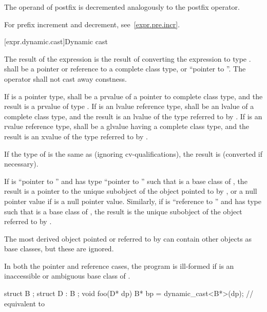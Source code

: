 \pnum
{}%
%
%
%
The operand of postfix \tcode{--} is decremented analogously to the
postfix \tcode{++} operator.
\begin{note}
For prefix increment and decrement, see~\ref{expr.pre.incr}.
\end{note}

[expr.dynamic.cast]{Dynamic cast}

\pnum
{}%
%
The result of the expression  is the result of
converting the expression  to type .
%
 shall be a pointer or reference to a complete class type, or
``pointer to \cv{} ''. The  operator shall not cast
away constness.

\pnum
If  is a pointer type,  shall be a prvalue of a
pointer to complete class type, and the result is a prvalue of type
. If  is an lvalue reference type,  shall be
an lvalue of a complete class type, and the result is an lvalue of the
type referred to by . If  is an rvalue reference type,
 shall be a glvalue having a complete class type, and the
result is an xvalue of the type referred to by .

\pnum
If the type of  is the same as  (ignoring cv-qualifications),
the result is
 (converted if necessary).

\pnum
If  is ``pointer to  '' and  has
type ``pointer to  '' such that  is a base
class of , the result is a pointer to the unique 
subobject of the  object pointed to by , or
a null pointer value if  is a null pointer value.
Similarly, if
 is ``reference to  '' and  has
type   such that  is a base class of
, the result is the unique  subobject of the 
object referred to by .
\begin{footnote}
The most derived
object pointed or referred to by
 can contain other  objects as base classes, but these
are ignored.
\end{footnote}
In both the pointer and
reference cases, the program is ill-formed if  is an inaccessible or
ambiguous base class of .
\begin{example}
\begin{codeblock}
struct B { };
struct D : B { };
void foo(D* dp) {
  B*  bp = dynamic_cast<B*>(dp);    // equivalent to 
}
\end{codeblock}
\end{example}

